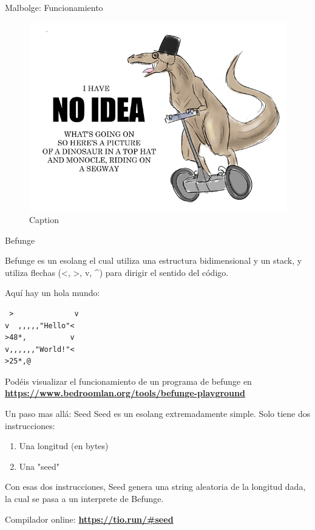 \documentclass{beamer}
\begin{document}
\begin{frame}{Malbolge: Funcionamiento}
\pause
    \begin{figure}
        \centering
        \includegraphics[width=\textwidth]{latex/static/noidea.png}
        \caption{Caption}
        \label{fig:my_label}
    \end{figure}
\end{frame}

\begin{frame}[fragile]{Befunge}

Befunge es un esolang el cual utiliza una estructura bidimensional y un stack, y utiliza flechas (\textless, \textgreater, v, \textasciicircum ) para dirigir el sentido del código.

Aquí hay un hola mundo:
\begin{lstlisting}
 >              v
v  ,,,,,"Hello"<
>48*,          v
v,,,,,,"World!"<
>25*,@
\end{lstlisting}
    
Podéis visualizar el funcionamiento de un programa de befunge en \textbf{\hyperlink{https://www.bedroomlan.org/tools/befunge-playground
}{https://www.bedroomlan.org/tools/befunge-playground}} 
\end{frame}
\begin{frame}{Un paso mas allá: Seed}
Seed es un esolang extremadamente simple. Solo tiene dos instrucciones:
\begin{enumerate}
    \item Una longitud (en bytes)
    \item Una "seed"
\end{enumerate}

Con esas dos instrucciones, Seed genera una string aleatoria de la longitud dada, la cual se pasa a un interprete de Befunge.

Compilador online: \textbf{\hyperlink{https://tio.run/#seed}{https://tio.run/#seed}} 
\end{frame}
\end{document}
